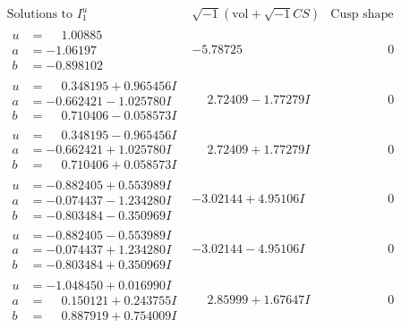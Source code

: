 \documentclass[1p]{elsarticle_modified}
\theoremstyle{definition}
\newcommand{\I}{\sqrt{-1}}
\begin{document}
$$\begin{array}{c|c|c}  
\text{Solutions to }I^u_{1}& \I (\text{vol} + \sqrt{-1}CS) & \text{Cusp shape}\\
 \hline 
\begin{aligned}
u &= \phantom{-}1.00885\phantom{ +0.000000I} \\
a &= -1.06197\phantom{ +0.000000I} \\
b &= -0.898102\phantom{ +0.000000I}\end{aligned}
 & -5.78725\phantom{ +0.000000I} & \phantom{-0.000000 } 0 \\ \hline\begin{aligned}
u &= \phantom{-}0.348195 + 0.965456 I \\
a &= -0.662421 - 1.025780 I \\
b &= \phantom{-}0.710406 - 0.058573 I\end{aligned}
 & \phantom{-}2.72409 - 1.77279 I & \phantom{-0.000000 } 0 \\ \hline\begin{aligned}
u &= \phantom{-}0.348195 - 0.965456 I \\
a &= -0.662421 + 1.025780 I \\
b &= \phantom{-}0.710406 + 0.058573 I\end{aligned}
 & \phantom{-}2.72409 + 1.77279 I & \phantom{-0.000000 } 0 \\ \hline\begin{aligned}
u &= -0.882405 + 0.553989 I \\
a &= -0.074437 - 1.234280 I \\
b &= -0.803484 - 0.350969 I\end{aligned}
 & -3.02144 + 4.95106 I & \phantom{-0.000000 } 0 \\ \hline\begin{aligned}
u &= -0.882405 - 0.553989 I \\
a &= -0.074437 + 1.234280 I \\
b &= -0.803484 + 0.350969 I\end{aligned}
 & -3.02144 - 4.95106 I & \phantom{-0.000000 } 0 \\ \hline\begin{aligned}
u &= -1.048450 + 0.016990 I \\
a &= \phantom{-}0.150121 + 0.243755 I \\
b &= \phantom{-}0.887919 + 0.754009 I\end{aligned}
 & \phantom{-}2.85999 + 1.67647 I & \phantom{-0.000000 } 0 \\ \hline\begin{aligned}

\end{aligned}
\end{array}$$
\end{document}
